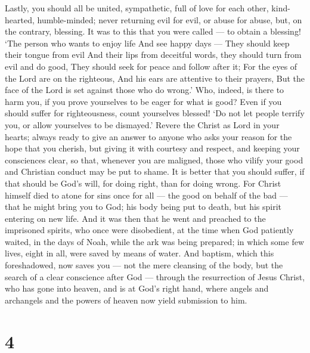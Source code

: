 Lastly, you should all be united, sympathetic, full of love
for each other, kind-hearted, humble-minded;  never
returning evil for evil, or abuse for abuse, but, on the contrary,
blessing. It was to this that you were called --- to obtain a blessing!
 `The person who wants to enjoy life And see happy days ---
They should keep their tongue from evil And their lips from deceitful
words,  they should turn from evil and do good, They should
seek for peace and follow after it;  For the eyes of the
Lord are on the righteous, And his ears are attentive to their prayers,
But the face of the Lord is set against those who do wrong.'
 Who, indeed, is there to harm you, if you prove yourselves
to be eager for what is good?  Even if you should suffer
for righteousness, count yourselves blessed! `Do not let people terrify
you, or allow yourselves to be dismayed.'  Revere the
Christ as Lord in your hearts; always ready to give an answer to anyone
who asks your reason for the hope that you cherish, but giving it with
courtesy and respect,  and keeping your consciences clear,
so that, whenever you are maligned, those who vilify your good and
Christian conduct may be put to shame.  It is better that
you should suffer, if that should be God's will, for doing right, than
for doing wrong.  For Christ himself died to atone for sins
once for all --- the good on behalf of the bad --- that he might bring
you to God; his body being put to death, but his spirit entering on new
life.  And it was then that he went and preached to the
imprisoned spirits,  who once were disobedient, at the time
when God patiently waited, in the days of Noah, while the ark was being
prepared; in which some few lives, eight in all, were saved by means of
water.  And baptism, which this foreshadowed, now saves you
--- not the mere cleansing of the body, but the search of a clear
conscience after God --- through the resurrection of Jesus Christ,
 who has gone into heaven, and is at God's right hand,
where angels and archangels and the powers of heaven now yield
submission to him.

\hypertarget{section-3}{%
\section{4}\label{section-3}}


